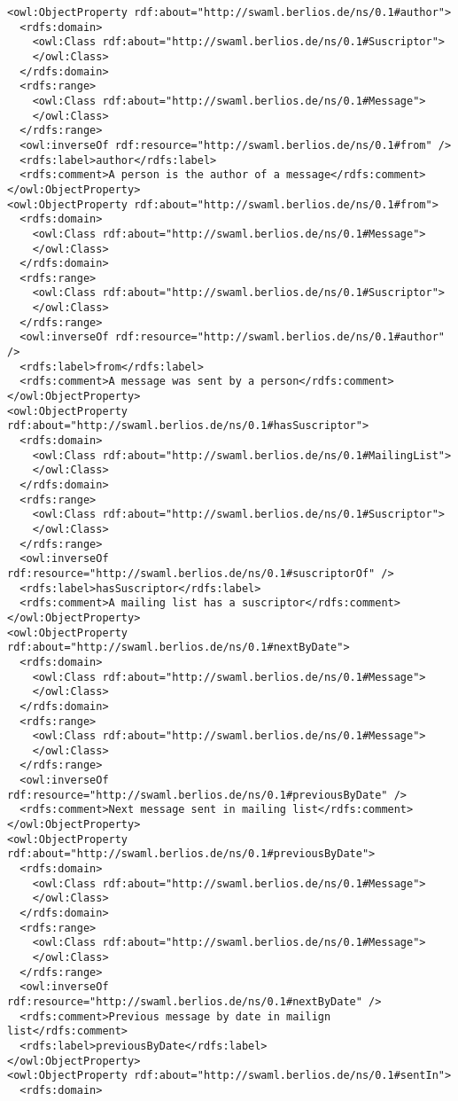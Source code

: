 \begin{lstlisting}
<owl:ObjectProperty rdf:about="http://swaml.berlios.de/ns/0.1#author">
  <rdfs:domain>
    <owl:Class rdf:about="http://swaml.berlios.de/ns/0.1#Suscriptor">
    </owl:Class>
  </rdfs:domain>
  <rdfs:range>
    <owl:Class rdf:about="http://swaml.berlios.de/ns/0.1#Message">
    </owl:Class>
  </rdfs:range>
  <owl:inverseOf rdf:resource="http://swaml.berlios.de/ns/0.1#from" />
  <rdfs:label>author</rdfs:label>
  <rdfs:comment>A person is the author of a message</rdfs:comment>
</owl:ObjectProperty>
<owl:ObjectProperty rdf:about="http://swaml.berlios.de/ns/0.1#from">
  <rdfs:domain>
    <owl:Class rdf:about="http://swaml.berlios.de/ns/0.1#Message">
    </owl:Class>
  </rdfs:domain>
  <rdfs:range>
    <owl:Class rdf:about="http://swaml.berlios.de/ns/0.1#Suscriptor">
    </owl:Class>
  </rdfs:range>
  <owl:inverseOf rdf:resource="http://swaml.berlios.de/ns/0.1#author" />
  <rdfs:label>from</rdfs:label>
  <rdfs:comment>A message was sent by a person</rdfs:comment>
</owl:ObjectProperty>
<owl:ObjectProperty rdf:about="http://swaml.berlios.de/ns/0.1#hasSuscriptor">
  <rdfs:domain>
    <owl:Class rdf:about="http://swaml.berlios.de/ns/0.1#MailingList">
    </owl:Class>
  </rdfs:domain>
  <rdfs:range>
    <owl:Class rdf:about="http://swaml.berlios.de/ns/0.1#Suscriptor">
    </owl:Class>
  </rdfs:range>
  <owl:inverseOf rdf:resource="http://swaml.berlios.de/ns/0.1#suscriptorOf" />
  <rdfs:label>hasSuscriptor</rdfs:label>
  <rdfs:comment>A mailing list has a suscriptor</rdfs:comment>
</owl:ObjectProperty>
<owl:ObjectProperty rdf:about="http://swaml.berlios.de/ns/0.1#nextByDate">
  <rdfs:domain>
    <owl:Class rdf:about="http://swaml.berlios.de/ns/0.1#Message">
    </owl:Class>
  </rdfs:domain>
  <rdfs:range>
    <owl:Class rdf:about="http://swaml.berlios.de/ns/0.1#Message">
    </owl:Class>
  </rdfs:range>
  <owl:inverseOf rdf:resource="http://swaml.berlios.de/ns/0.1#previousByDate" />
  <rdfs:comment>Next message sent in mailing list</rdfs:comment>
</owl:ObjectProperty>
<owl:ObjectProperty rdf:about="http://swaml.berlios.de/ns/0.1#previousByDate">
  <rdfs:domain>
    <owl:Class rdf:about="http://swaml.berlios.de/ns/0.1#Message">
    </owl:Class>
  </rdfs:domain>
  <rdfs:range>
    <owl:Class rdf:about="http://swaml.berlios.de/ns/0.1#Message">
    </owl:Class>
  </rdfs:range>
  <owl:inverseOf rdf:resource="http://swaml.berlios.de/ns/0.1#nextByDate" />
  <rdfs:comment>Previous message by date in mailign list</rdfs:comment>
  <rdfs:label>previousByDate</rdfs:label>
</owl:ObjectProperty>
<owl:ObjectProperty rdf:about="http://swaml.berlios.de/ns/0.1#sentIn">
  <rdfs:domain>

\end{lstlisting}
